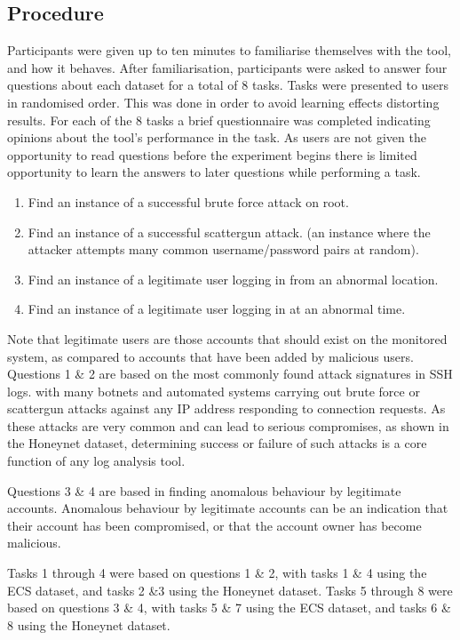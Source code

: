 \subsection{Procedure}
Participants were given up to ten minutes to familiarise themselves with the tool, and how it behaves. After familiarisation, participants were asked to answer four questions about each  dataset for a total of 8 tasks. Tasks were presented to users in randomised order. This was done in order to avoid learning effects distorting results. For each of the 8 tasks a brief questionnaire was completed indicating opinions about the tool's performance in the task\cite{lewis1995ibm}. As users are not given the opportunity to read questions before the experiment begins there is limited opportunity to learn the answers to later questions while performing a task. 

\begin{enumerate}
\item{Find an instance of a successful brute force attack on root.}
\item{Find an instance of a successful scattergun attack.
(an instance where the attacker attempts many common username/password pairs at random).}
\item{Find an instance of a legitimate user logging in from an abnormal location.}
\item{Find an instance of a legitimate user logging in at an abnormal time.}
\end{enumerate}

Note that legitimate users are those accounts that should exist on the monitored system, as compared to accounts that have been added by malicious users.
Questions 1 \& 2 are based on the most commonly found attack signatures in SSH logs. with many botnets and automated systems carrying out brute force or scattergun attacks against any IP address responding to connection requests. As these attacks are very common and can lead to serious compromises, as shown in the Honeynet dataset, determining success or failure of such attacks is a core function of any log analysis tool. 

Questions 3 \& 4 are based in finding anomalous behaviour by legitimate accounts. Anomalous behaviour by legitimate accounts can be an indication that their account has been compromised, or that the account owner has become malicious.  

Tasks 1 through 4 were based on questions 1 \& 2, with tasks 1 \& 4 using the ECS dataset, and tasks 2 \&3 using the Honeynet dataset.
Tasks 5 through 8 were based on questions 3 \& 4, with tasks 5 \& 7 using the ECS dataset, and tasks 6 \& 8 using  the Honeynet dataset. 

